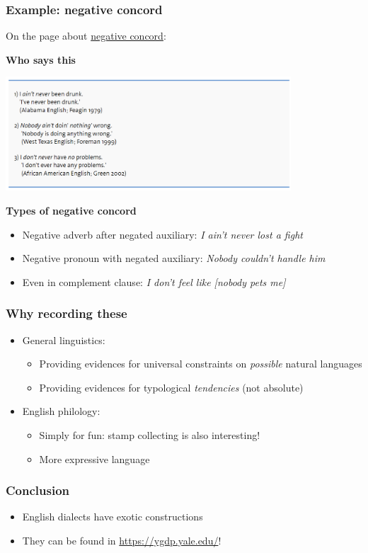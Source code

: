 \documentclass{beamer}
\newcommand{\corpus}[1]{\emph{#1}}
\begin{document}
\begin{frame}
\frametitle{Example: negative concord}

On the page about \href{https://ygdp.yale.edu/phenomena/negative-concord}{negative concord}:

\textbf{Who says this}

\begin{center}
    \includegraphics[width=0.8\textwidth]{pics/content-example-2.PNG}
\end{center}    

\textbf{Types of negative concord}

\begin{itemize}
    \item Negative adverb after negated auxiliary: \corpus{I ain't never lost a fight}
    \item Negative pronoun with negated auxiliary: \corpus{Nobody couldn't handle him}
    \item Even in complement clause: \corpus{I don't feel like [nobody pets me]}
\end{itemize}

\end{frame}

\begin{frame}
\frametitle{Why recording these}

\begin{itemize}
    \item General linguistics:
    \begin{itemize}
        \item Providing evidences for universal constraints on \emph{possible} natural languages
        \item Providing evidences for typological \emph{tendencies} (not absolute) 
    \end{itemize}
    \item English philology:
    \begin{itemize}
        \item Simply for fun: stamp collecting is also interesting!
        \item More expressive language
    \end{itemize}
\end{itemize}    

\end{frame}

\begin{frame}
\frametitle{Conclusion}

\begin{itemize}
    \item English dialects have exotic constructions
    \item They can be found in \url{https://ygdp.yale.edu/}!
\end{itemize}    

\end{frame}
\end{document}
